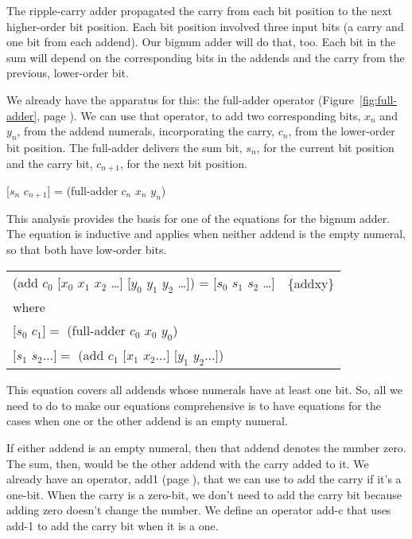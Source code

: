 The ripple-carry adder propagated the carry from each bit position
to the next higher-order bit position.
Each bit position involved three input bits
(a carry and one bit from each addend).
Our bignum adder will do that, too.
Each bit in the sum will depend on the
corresponding bits in the addends and the carry from
the previous, lower-order bit.

We already have the apparatus for this: the full-adder operator
(Figure~\ref{fig:full-adder},  page \pageref{fig:full-adder}).
We can use that operator, to add two corresponding bits,
$x_n$ and $y_n$, from the addend numerals,
incorporating the carry, $c_n$, from the lower-order bit position.
The full-adder delivers the sum bit, $s_n$, for the current
bit position and the carry bit, $c_{n+1}$, for the next bit position.
\begin{center}
[$s_n$ $c_{n+1}$] = (full-adder $c_n$ $x_n$ $y_n$)
\end{center}

This analysis provides the basis for
one of the equations for the bignum adder.
The equation is inductive and applies
when neither addend is the empty numeral, 
so that both have low-order bits.

\begin{center}
\begin{tabular}{ll}
(add $c_0$ [$x_0$ $x_1$ $x_2$ \dots ] [$y_0$ $y_1$ $y_2$ \dots ]) = [$s_0$ $s_1$ $s_2$ \dots ]   & \{addxy\} \\
where & \\
$[s_0$ $c_1] =$ (full-adder $c_0$ $x_0$ $y_0$) & \\
$[s_1$ $s_2 \dots ] =$ (add $c_1$ $[x_1$ $x_2 \dots ]$ $[y_1$ $y_2 \dots ]$) & \\
\end{tabular}
\end{center}

This equation covers all addends whose numerals have at least one bit.
So, all we need to do to make our equations comprehensive
is to have equations for the cases when one or the other addend is an empty numeral.

If either addend is an empty numeral, then that addend denotes the number zero.
The sum, then, would be the other addend with the carry added to it.
We already have an operator, add1 (page \pageref{add-1-defun}),
that we can use to add the carry if it's a one-bit.
When the carry is a zero-bit, we don't need to add the carry bit
because adding zero doesn't change the number.
We define an operator add-c that uses add-1 to add the carry bit
when it is a one.

